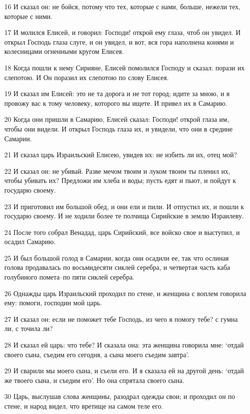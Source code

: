 \par 16 И сказал он: не бойся, потому что тех, которые с нами, больше, нежели тех, которые с ними.
\par 17 И молился Елисей, и говорил: Господи! открой ему глаза, чтоб он увидел. И открыл Господь глаза слуге, и он увидел, и вот, вся гора наполнена конями и колесницами огненными кругом Елисея.
\par 18 Когда пошли к нему Сирияне, Елисей помолился Господу и сказал: порази их слепотою. И Он поразил их слепотою по слову Елисея.
\par 19 И сказал им Елисей: это не та дорога и не тот город; идите за мною, и я провожу вас к тому человеку, которого вы ищете. И привел их в Самарию.
\par 20 Когда они пришли в Самарию, Елисей сказал: Господи! открой глаза им, чтобы они видели. И открыл Господь глаза их, и увидели, что они в средине Самарии.
\par 21 И сказал царь Израильский Елисею, увидев их: не избить ли их, отец мой?
\par 22 И сказал он: не убивай. Разве мечом твоим и луком твоим ты пленил их, чтобы убивать их? Предложи им хлеба и воды; пусть едят и пьют, и пойдут к государю своему.
\par 23 И приготовил им большой обед, и они ели и пили. И отпустил их, и пошли к государю своему. И не ходили более те полчища Сирийские в землю Израилеву.
\par 24 После того собрал Венадад, царь Сирийский, все войско свое и выступил, и осадил Самарию.
\par 25 И был большой голод в Самарии, когда они осадили ее, так что ослиная голова продавалась по восьмидесяти сиклей серебра, и четвертая часть каба голубиного помета--по пяти сиклей серебра.
\par 26 Однажды царь Израильский проходил по стене, и женщина с воплем говорила ему: помоги, господин мой царь.
\par 27 И сказал он: если не поможет тебе Господь, из чего я помогу тебе? с гумна ли, с точила ли?
\par 28 И сказал ей царь: что тебе? И сказала она: эта женщина говорила мне: `отдай своего сына, съедим его сегодня, а сына моего съедим завтра'.
\par 29 И сварили мы моего сына, и съели его. И я сказала ей на другой день: `отдай же твоего сына, и съедим его'. Но она спрятала своего сына.
\par 30 Царь, выслушав слова женщины, разодрал одежды свои; и проходил он по стене, и народ видел, что вретище на самом теле его.
